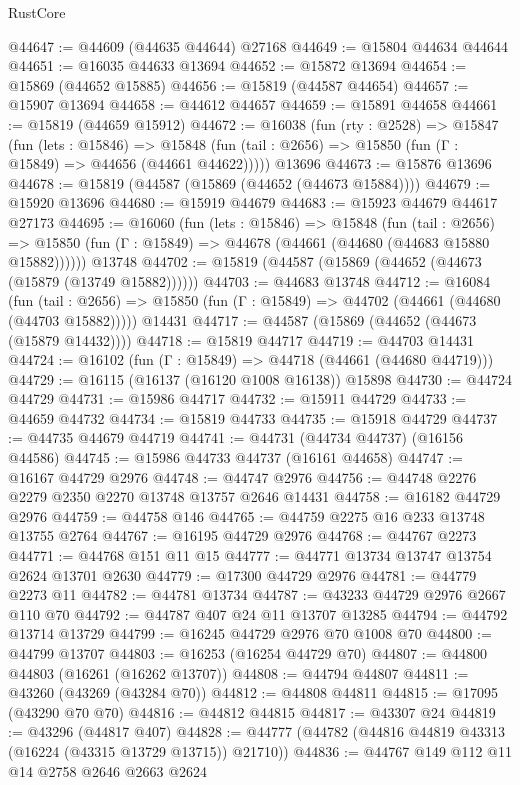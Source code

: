 \begin{lexlean}{RustCore}
\begin{coremodule}
@44647 := @44609 (@44635 @44644) @27168
@44649 := @15804 @44634 @44644
@44651 := @16035 @44633 @13694
@44652 := @15872 @13694
@44654 := @15869 (@44652 @15885)
@44656 := @15819 (@44587 @44654)
@44657 := @15907 @13694
@44658 := @44612 @44657
@44659 := @15891 @44658
@44661 := @15819 (@44659 @15912)
@44672 := @16038
    (fun (rty : @2528) =>
    @15847
      (fun (lets : @15846) =>
      @15848 (fun (tail : @2656) => @15850 (fun (Γ : @15849) => @44656 (@44661 @44622)))))
    @13696
@44673 := @15876 @13696
@44678 := @15819 (@44587 (@15869 (@44652 (@44673 @15884))))
@44679 := @15920 @13696
@44680 := @15919 @44679
@44683 := @15923 @44679 @44617 @27173
@44695 := @16060
    (fun (lets : @15846) =>
    @15848
      (fun (tail : @2656) =>
      @15850 (fun (Γ : @15849) => @44678 (@44661 (@44680 (@44683 @15880 @15882))))))
    @13748
@44702 := @15819 (@44587 (@15869 (@44652 (@44673 (@15879 (@13749 @15882))))))
@44703 := @44683 @13748
@44712 := @16084
    (fun (tail : @2656) => @15850 (fun (Γ : @15849) => @44702 (@44661 (@44680 (@44703 @15882)))))
    @14431
@44717 := @44587 (@15869 (@44652 (@44673 (@15879 @14432))))
@44718 := @15819 @44717
@44719 := @44703 @14431
@44724 := @16102 (fun (Γ : @15849) => @44718 (@44661 (@44680 @44719)))
@44729 := @16115 (@16137 (@16120 @1008 @16138)) @15898
@44730 := @44724 @44729
@44731 := @15986 @44717
@44732 := @15911 @44729
@44733 := @44659 @44732
@44734 := @15819 @44733
@44735 := @15918 @44729
@44737 := @44735 @44679 @44719
@44741 := @44731 (@44734 @44737) (@16156 @44586)
@44745 := @15986 @44733 @44737 (@16161 @44658)
@44747 := @16167 @44729 @2976
@44748 := @44747 @2976
@44756 := @44748 @2276 @2279 @2350 @2270 @13748 @13757 @2646 @14431
@44758 := @16182 @44729 @2976
@44759 := @44758 @146
@44765 := @44759 @2275 @16 @233 @13748 @13755 @2764
@44767 := @16195 @44729 @2976
@44768 := @44767 @2273
@44771 := @44768 @151 @11 @15
@44777 := @44771 @13734 @13747 @13754 @2624 @13701 @2630
@44779 := @17300 @44729 @2976
@44781 := @44779 @2273 @11
@44782 := @44781 @13734
@44787 := @43233 @44729 @2976 @2667 @110 @70
@44792 := @44787 @407 @24 @11 @13707 @13285
@44794 := @44792 @13714 @13729
@44799 := @16245 @44729 @2976 @70 @1008 @70
@44800 := @44799 @13707
@44803 := @16253 (@16254 @44729 @70)
@44807 := @44800 @44803 (@16261 (@16262 @13707))
@44808 := @44794 @44807
@44811 := @43260 (@43269 (@43284 @70))
@44812 := @44808 @44811
@44815 := @17095 (@43290 @70 @70)
@44816 := @44812 @44815
@44817 := @43307 @24
@44819 := @43296 (@44817 @407)
@44828 := @44777 (@44782 (@44816 @44819 @43313 (@16224 (@43315 @13729 @13715)) @21710))
@44836 := @44767 @149 @112 @11 @14 @2758 @2646 @2663 @2624

\end{coremodule}
\end{lexlean}
